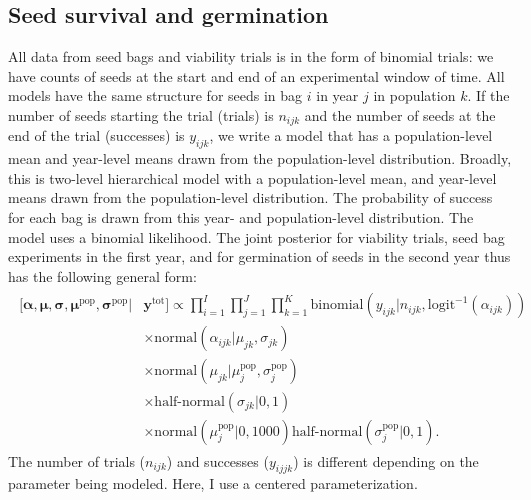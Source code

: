 \documentclass[12pt, oneside, titlepage]{article}   	%
\begin{document}
\subsection{Seed survival and germination}

All data from seed bags and viability trials is in the form of binomial trials: we have counts of seeds at the start and end of an experimental window of time. All models have the same structure for seeds in bag $i$ in year $j$ in population $k$. If the number of seeds starting the trial (trials) is $n_{ijk}$ and the number of seeds at the end of the trial (successes) is $y_{ijk}$, we write a model that has a population-level mean and year-level means drawn from the population-level distribution. Broadly, this is two-level hierarchical model with a population-level mean, and year-level means drawn from the population-level distribution. The probability of success for each bag is drawn from this year- and population-level distribution. The model uses a binomial likelihood. The joint posterior for viability trials, seed bag experiments in the first year, and for germination of seeds in the second year thus has the following general form:
%
\begin{align}
  \begin{split}
 [  \bm{\alpha} , \bm{\mu} , \bm{\sigma} , \bm{\mu^\mathrm{pop}}, \bm{\sigma^\mathrm{pop}} | & \bm{y^{\mathrm{tot}}}  ] \propto \prod_{i=1}^{I}   \prod_{j=1}^{J}  \prod_{k=1}^{K} 
   \mathrm{binomial} ( y_{ijk} | n_{ijk}, \mathrm{logit}^{-1}( \alpha_{ijk} ) ) 
   \\ & \times \mathrm{normal} ( \alpha_{ijk}  | \mu_{jk}, \sigma{_{jk} })
  \\ & \times \mathrm{normal} ( \mu_{jk}  | \mu^\mathrm{pop}_{j}, \sigma^\mathrm{pop}_{j} )
  \\ & \times \textrm{half-normal} ( \sigma_{jk} | 0,1)
  \\ & \times \mathrm{normal} ( \mu^\mathrm{pop}_{j} | 0 , 1000 ) \textrm{half-normal} ( \sigma^\mathrm{pop}_{j} | 0,1).
  \end{split}
\end{align}
%
 The number of trials ($n_{ijk}$) and successes ($y_{ijjk}$) is different depending on the parameter being modeled. Here, I use a centered parameterization.
 
\end{document}
